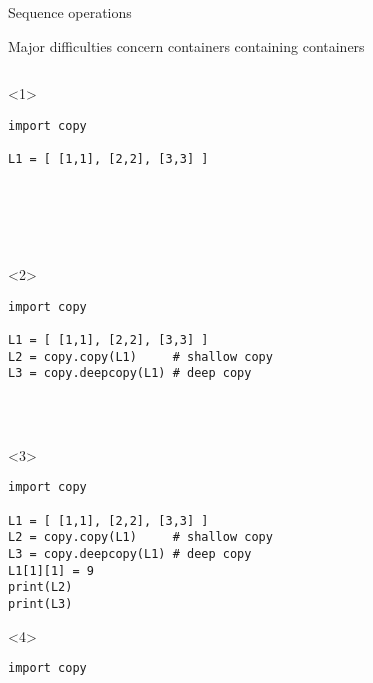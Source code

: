 \begin{frame}[fragile]{Sequence operations}

   Major difficulties concern containers containing containers

  \begin{center}

  \begin{columns}[onlytextwidth]
    \begin{column}{\textwidth}

      \begin{onlyenv}<1>
        \begin{lstlisting}[style=python,morekeywords={for, in, range, list}]
import copy

L1 = [ [1,1], [2,2], [3,3] ]






 \end{lstlisting}
      \end{onlyenv}

      \begin{onlyenv}<2>
        \begin{lstlisting}[style=python,morekeywords={for, in, range, list}]
import copy

L1 = [ [1,1], [2,2], [3,3] ]
L2 = copy.copy(L1)     # shallow copy
L3 = copy.deepcopy(L1) # deep copy




 \end{lstlisting}
      \end{onlyenv}

      \begin{onlyenv}<3>
        \begin{lstlisting}[style=python,morekeywords={for, in, range, list}]
import copy

L1 = [ [1,1], [2,2], [3,3] ]
L2 = copy.copy(L1)     # shallow copy
L3 = copy.deepcopy(L1) # deep copy
L1[1][1] = 9
print(L2)
print(L3)

 \end{lstlisting}
      \end{onlyenv}

      \begin{onlyenv}<4>
        \begin{lstlisting}[style=python,morekeywords={for, in, range, list}]
import copy


\end{lstlisting}
\end{onlyenv}
\end{column}
\end{columns}
\end{center}
\end{frame}
